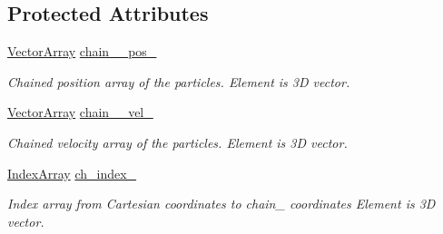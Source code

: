 \subsection*{Protected Attributes}
\begin{DoxyCompactItemize}
\item 
\mbox{\hyperlink{class_vel_indep_particles_a27580f65b6523bfb6900520af2e44708}{Vector\+Array}} \mbox{\hyperlink{class_vel_indep_chain_particles_a8e2defc6dcb9986dbc9c8c62215331aa}{chain_\+\_\+pos\+\_\+}}
\begin{DoxyCompactList}\small\item\em Chained position array of the particles. Element is 3D vector. \end{DoxyCompactList}\item 
\mbox{\hyperlink{class_vel_indep_particles_a27580f65b6523bfb6900520af2e44708}{Vector\+Array}} \mbox{\hyperlink{class_vel_indep_chain_particles_a96ed0f2a5fcfb290dfafb42f08131e2f}{chain_\+\_\+vel\+\_\+}}
\begin{DoxyCompactList}\small\item\em Chained velocity array of the particles. Element is 3D vector. \end{DoxyCompactList}\item 
\mbox{\hyperlink{class_vel_indep_chain_particles_a691749351fb710d16619ef6cc43bb1e6}{Index\+Array}} \mbox{\hyperlink{class_vel_indep_chain_particles_a8f10bc65c3e0de542db29178824522cb}{ch\+\_\+index\+\_\+}}
\begin{DoxyCompactList}\small\item\em Index array from Cartesian coordinates to chain_ coordinates Element is 3D vector. \end{DoxyCompactList}\end{DoxyCompactItemize}

